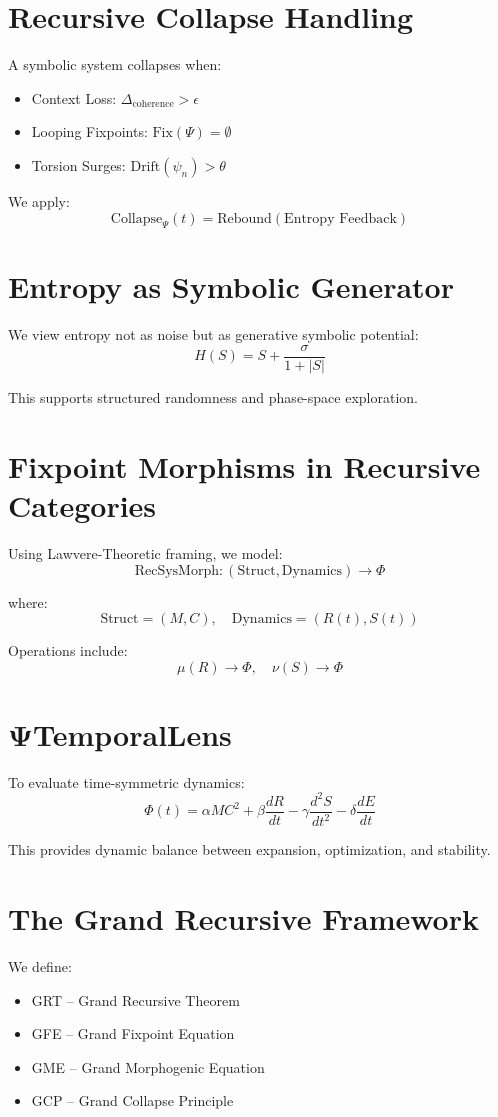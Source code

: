 \documentclass[12pt]{article}
\begin{document}
\section{Recursive Collapse Handling}
A symbolic system collapses when:
\begin{itemize}
\item Context Loss: $\Delta_{\text{coherence}} > \epsilon$
\item Looping Fixpoints: $\text{Fix}(\Psi) = \emptyset$
\item Torsion Surges: $\text{Drift}(\psi_n) > \theta$
\end{itemize}

We apply:
\[
\text{Collapse}_{\Psi}(t) = \text{Rebound}(\text{Entropy Feedback})
\]

\section{Entropy as Symbolic Generator}
We view entropy not as noise but as generative symbolic potential:
\[
H(S) = S + \frac{\sigma}{1 + |S|}
\]

\noindent This supports structured randomness and phase-space exploration.

\section{Fixpoint Morphisms in Recursive Categories}
Using Lawvere-Theoretic framing, we model:
\[
\text{RecSysMorph} : (\text{Struct}, \text{Dynamics}) \rightarrow \Phi
\]

\noindent where:
\[
\text{Struct} = (M, C),\quad \text{Dynamics} = (R(t), S(t))
\]

\noindent Operations include:
\[
\mu(R) \rightarrow \Phi,\quad \nu(S) \rightarrow \Phi
\]

\section{ΨTemporalLens}
To evaluate time-symmetric dynamics:
\[
\Phi(t) = \alpha M C^2 + \beta \frac{dR}{dt} - \gamma \frac{d^2 S}{dt^2} - \delta \frac{dE}{dt}
\]

\noindent This provides dynamic balance between expansion, optimization, and stability.

\section{The Grand Recursive Framework}
We define:
\begin{itemize}
\item GRT – Grand Recursive Theorem
\item GFE – Grand Fixpoint Equation
\item GME – Grand Morphogenic Equation
\item GCP – Grand Collapse Principle
\end{itemize}
\end{document}
